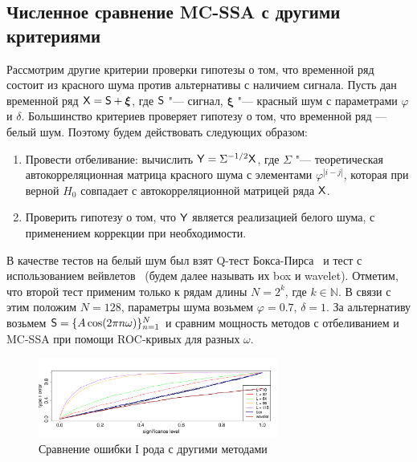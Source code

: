 \documentclass[specialist,
substylefile = spbu_report.rtx,
subf,href,colorlinks=true, 12pt]{disser}
\theoremstyle{definition}
\newtheorem{remark}{Замечание}
\newcommand{\bfxi}{\boldsymbol{\xi}}
\begin{document}

\subsection{Численное сравнение MC-SSA с другими критериями}\label{sect:mc-ssa_comparison}
Рассмотрим другие критерии проверки гипотезы о том, что временной ряд состоит из красного шума против альтернативы с наличием сигнала. Пусть дан временной ряд $\tX=\tS+\bfxi$, где $\mathsf{S}$ "--- сигнал, $\bfxi$ "--- красный шум с параметрами $\varphi$ и $\delta$. Большинство критериев проверяет гипотезу о том, что временной ряд --- белый шум. Поэтому будем действовать следующих образом:
\begin{enumerate}
	\item Провести отбеливание: вычислить $\mathsf{Y}=\Sigma^{-1/2}\mathsf{X}$, где $\Sigma$ "--- теоретическая автокорреляционная матрица красного шума с элементами $\varphi^{|i-j|}$, которая при верной $H_0$ совпадает с автокорреляционной матрицей ряда $\mathsf{X}$.
	\item Проверить гипотезу о том, что $\mathsf{Y}$ является реализацией белого шума, с применением коррекции при необходимости.
\end{enumerate}
В качестве тестов на белый шум был взят Q-тест Бокса-Пирса~\cite{box-pierce} и тест с использованием вейвлетов~\cite{wavelet} (будем далее называть их box и wavelet). Отметим, что второй тест применим только к рядам длины $N=2^k$, где $k\in\mathbb{N}$. В связи с этим положим $N=128$, параметры шума возьмем $\varphi=0.7$, $\delta=1$. За альтернативу возьмем $\mathsf{S}=\{A\cos(2\pi n\omega)\}_{n=1}^N$ и сравним мощность методов с отбеливанием и MC-SSA при помощи ROC-кривых для разных $\omega$.

\begin{figure}[h!]
	\centering
	\includegraphics[width=0.7\textwidth]{img/alphaI_testAR.pdf}
	\caption{Сравнение ошибки I рода с другими методами}
	\label{alphaI_testAR}
\end{figure}
\end{document}
